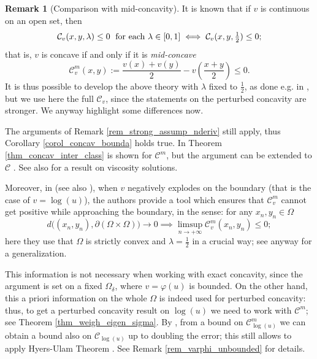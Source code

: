 \documentclass[11pt, reqno]{amsart}
\theoremstyle{definition}
\newtheorem{remark}[lemma]{Remark}
\numberwithin{equation}{section}
\newcommand{\mc}[1]{\mathcal{#1}}
\begin{document}
\begin{remark}[Comparison with mid-concavity]
\label{rem_mid_concav}
It is known that if $v$ is continuous on an open set, then
$$\mc{C}_v(x,y,\lambda) \leq 0 \; \hbox{ for each $\lambda \in [0,1]$} \iff \mc{C}_v(x,y,\tfrac{1}{2})\leq 0;$$
that is, $v$ is concave if and only if it is \emph{mid-concave}
$$\mc{C}^m_v(x,y):= \frac{v(x)+v(y)}{2} - v\left(\frac{x+y}{2}\right) \leq 0.$$
It is thus possible to develop the above theory with $\lambda$ fixed to $\frac{1}{2}$, as done e.g. in \cite{Kaw85R, GrPo93, Juu10}, but we use here the full $\mc{C}_v$, since the statements on the perturbed concavity are stronger.
We anyway highlight some differences now. 

The arguments of Remark \ref{rem_strong_assump_nderiv} still apply, thus Corollary \ref{corol_concav_bounda} holds true. 
In \cite[Theorem 2.1]{GrPo93} Theorem \ref{thm_concav_inter_class} is shown for $\mc{C}^m$, but the argument can be extended to $\mc{C}$ \cite[proof of Proposition 2.1]{MRS24}. 
See also \cite[Theorems 3.4 and 3.5]{Juu10} for a result on viscosity solutions.

Moreover, in \cite[Lemma 3.2]{GrPo93} (see also \cite[Lemma 3.12]{Kaw85R}), when $v$ negatively explodes on the boundary (that is the case of $v=\log(u)$), the authors provide a tool which ensures that $\mc{C}^m_v$ cannot get positive while approaching the boundary, in the sense: for any $x_n, y_n \in \Omega$
\begin{equation}\label{eq_distante_bordo}
d\big( (x_n, y_n), \partial(\Omega \times \Omega)\big) \to 0 \implies \limsup_{n \to +\infty} \mc{C}^m_v (x_n, y_n) \leq 0;
\end{equation}
here they use that $\Omega$ is strictly convex and $\lambda = \frac{1}{2}$ in a crucial way; see anyway \cite[Lemma 1.30]{Mor24} for a generalization.

This information is not necessary when working with exact concavity, since the argument is set on a fixed $\Omega_{\delta}$, where $v=\varphi(u)$ is bounded. 
On the other hand, this a priori information on the whole $\Omega$ is indeed used for perturbed concavity: thus, to get a perturbed concavity result on $\log(u)$ we need to work with $\mc{C}^m$; see Theorem \ref{thm_weigh_eigen_sigma}. 
By \cite[Corollary 1]{NgNi93}, from a bound on $\mc{C}^m_{\log(u)}$ we can obtain a bound also on $\mc{C}_{\log(u)}$ up to doubling the error; this still allows to apply Hyers-Ulam Theorem \cite{HyUl52}. See Remark \ref{rem_varphi_unbounded} for details.
\end{remark}
\end{document}

